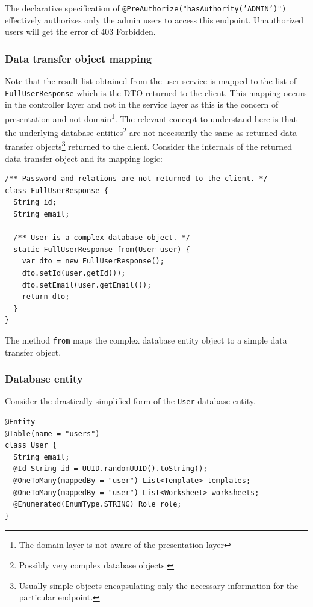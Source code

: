 \documentclass[a4paper,twoside,12pt]{book}
\begin{document}
The declarative specification of \texttt{@PreAuthorize("hasAuthority('ADMIN')")} effectively authorizes only the admin users to access this endpoint. Unauthorized users will get the error of 403 Forbidden.

\subsubsection{Data transfer object mapping}

Note that the result list obtained from the user service is mapped to the list of \texttt{FullUserResponse} which is the DTO returned to the client. This mapping occurs in the controller layer and not in the service layer as this is the concern of presentation and not domain\footnote{The domain layer is not aware of the presentation layer}.
%
The relevant concept to understand here is that the underlying database entities\footnote{Possibly very complex database objects.} are not necessarily the same as returned data transfer objects\footnote{Usually simple objects encapsulating only the necessary information for the particular endpoint.} returned to the client.
%
Consider the internals of the returned data transfer object and its mapping logic:

\begin{verbatim}
/** Password and relations are not returned to the client. */
class FullUserResponse {
  String id;
  String email;

  /** User is a complex database object. */
  static FullUserResponse from(User user) {
    var dto = new FullUserResponse();
    dto.setId(user.getId());
    dto.setEmail(user.getEmail());
    return dto;
  }
}
\end{verbatim}

The method \texttt{from} maps the complex database entity object to a simple data transfer object.

\subsubsection{Database entity}

Consider the drastically simplified form of the \verb|User| database entity.

\begin{verbatim}
@Entity
@Table(name = "users")
class User {
  String email;
  @Id String id = UUID.randomUUID().toString();
  @OneToMany(mappedBy = "user") List<Template> templates;
  @OneToMany(mappedBy = "user") List<Worksheet> worksheets;
  @Enumerated(EnumType.STRING) Role role;
}
\end{verbatim}
\end{document}
